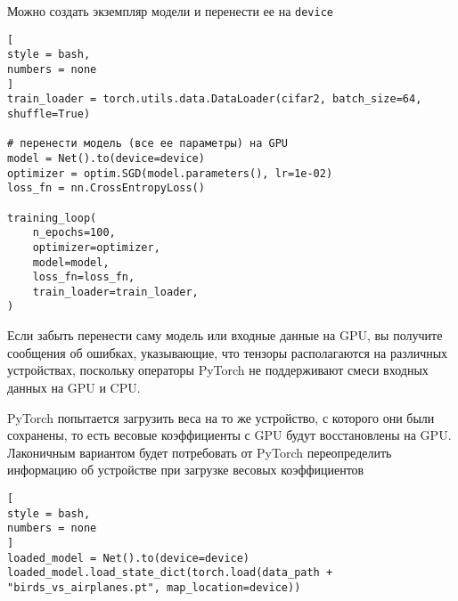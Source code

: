 \documentclass[%
	11pt,
	a4paper,
	utf8,
		]{article}
\begin{document}
Можно создать экземпляр модели и перенести ее на \verb|device|
\begin{lstlisting}[
style = bash,
numbers = none
]
train_loader = torch.utils.data.DataLoader(cifar2, batch_size=64, shuffle=True)

# перенести модель (все ее параметры) на GPU
model = Net().to(device=device)
optimizer = optim.SGD(model.parameters(), lr=1e-02)
loss_fn = nn.CrossEntropyLoss()

training_loop(
    n_epochs=100,
    optimizer=optimizer,
    model=model,
    loss_fn=loss_fn,
    train_loader=train_loader,
)
\end{lstlisting}

Если забыть перенести саму модель или входные данные на GPU, вы получите сообщения об ошибках, указывающие, что тензоры располагаются на различных устройствах, поскольку операторы PyTorch не поддерживают смеси входных данных на GPU и CPU.

PyTorch попытается загрузить веса на то же устройство, с которого они были сохранены, то есть весовые коэффициенты с GPU будут восстановлены на GPU. Лаконичным вариантом будет потребовать от PyTorch переопределить информацию об устройстве при загрузке весовых коэффициентов
\begin{lstlisting}[
style = bash,
numbers = none
]
loaded_model = Net().to(device=device)
loaded_model.load_state_dict(torch.load(data_path + "birds_vs_airplanes.pt", map_location=device))
\end{lstlisting}







\begin{thebibliography}{99}
	
\end{thebibliography}


\end{document}
